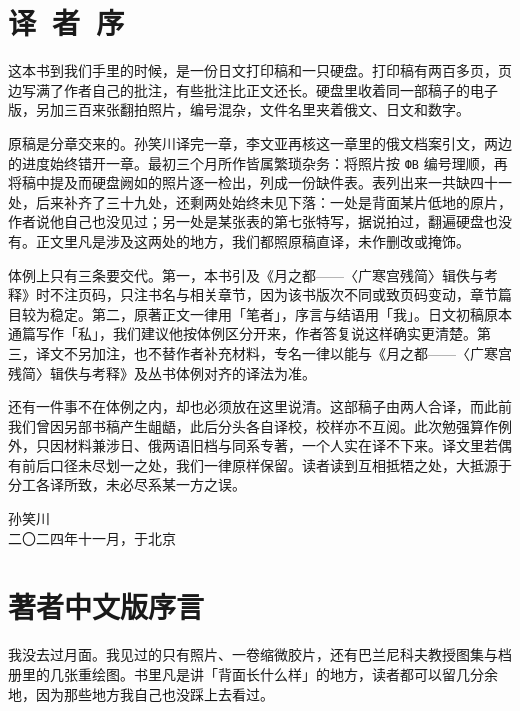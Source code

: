 \chapter*{译\ 者\ 序}
{}

这本书到我们手里的时候，是一份日文打印稿和一只硬盘。打印稿有两百多页，页边写满了作者自己的批注，有些批注比正文还长。硬盘里收着同一部稿子的电子版，另加三百来张翻拍照片，编号混杂，文件名里夹着俄文、日文和数字。

原稿是分章交来的。孙笑川译完一章，李文亚再核这一章里的俄文档案引文，两边的进度始终错开一章。最初三个月所作皆属繁琐杂务：将照片按 \texttt{ФВ} 编号理顺，再将稿中提及而硬盘阙如的照片逐一检出，列成一份缺件表。表列出来一共缺四十一处，后来补齐了三十九处，还剩两处始终未见下落：一处是背面某片低地的原片，作者说他自己也没见过；另一处是某张表的第七张特写，据说拍过，翻遍硬盘也没有。正文里凡是涉及这两处的地方，我们都照原稿直译，未作删改或掩饰。

体例上只有三条要交代。第一，本书引及《月之都——〈广寒宫残简〉辑佚与考释》时不注页码，只注书名与相关章节，因为该书版次不同或致页码变动，章节篇目较为稳定。第二，原著正文一律用「笔者」，序言与结语用「我」。日文初稿原本通篇写作「私」，我们建议他按体例区分开来，作者答复说这样确实更清楚。第三，译文不另加注，也不替作者补充材料，专名一律以能与《月之都——〈广寒宫残简〉辑佚与考释》及丛书体例对齐的译法为准。

还有一件事不在体例之内，却也必须放在这里说清。这部稿子由两人合译，而此前我们曾因另部书稿产生龃龉，此后分头各自译校，校样亦不互阅。此次勉强算作例外，只因材料兼涉日、俄两语旧档与同系专著，一个人实在译不下来。译文里若偶有前后口径未尽划一之处，我们一律原样保留。读者读到互相抵牾之处，大抵源于分工各译所致，未必尽系某一方之误。

\begin{flushright}
{\small 孙笑川}\\[2mm]
{\footnotesize\color{pencil} 二〇二四年十一月，于北京}
\end{flushright}

\clearpage
\chapter*{著者中文版序言}
{}

我没去过月面。我见过的只有照片、一卷缩微胶片，还有巴兰尼科夫教授图集与档册里的几张重绘图。书里凡是讲「背面长什么样」的地方，读者都可以留几分余地，因为那些地方我自己也没踩上去看过。

